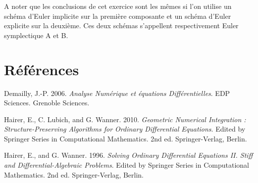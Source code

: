 A noter que les conclusions de cet exercice sont les mêmes si l'on
utilise un schéma d'Euler implicite sur la première composante et un
schéma d'Euler explicite sur la deuxième. Ces deux schémas s'appellent
respectivement Euler symplectique A et B.

\hypertarget{ed2-ruxe9fuxe9rences}{%
\chapter{Références}\label{ed2-ruxe9fuxe9rences}}

\hypertarget{ed2-refs}{}
\begin{cslreferences}
\leavevmode\hypertarget{ed2-ref-Dem06}{}%
Demailly, J.-P. 2006. \emph{Analyse Numérique et équations
Différentielles}. EDP Sciences. Grenoble Sciences.

\leavevmode\hypertarget{ed2-ref-Hairer10}{}%
Hairer, E., C. Lubich, and G. Wanner. 2010. \emph{Geometric Numerical
Integration : Structure-Preserving Algorithms for Ordinary Differential
Equations}. Edited by Springer Series in Computational Mathematics. 2nd
ed. Springer-Verlag, Berlin.

\leavevmode\hypertarget{ed2-ref-Hairer96}{}%
Hairer, E., and G. Wanner. 1996. \emph{Solving Ordinary Differential
Equations II. Stiff and Differential-Algebraic Problems}. Edited by
Springer Series in Computational Mathematics. 2nd ed. Springer-Verlag,
Berlin.
\end{cslreferences}
